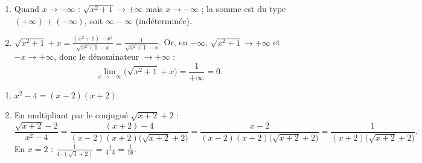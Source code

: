 \documentclass[11pt,a4paper]{article}
\begin{document}
\begin{correction}
\begin{enumerate}[label=\alph*),leftmargin=2em,itemsep=3pt]
  \item Quand $x\to-\infty$ : $\sqrt{x^2+1}\to+\infty$ mais $x\to-\infty$ ; la somme est du type
        $(+\infty)+(-\infty)$, soit $\infty-\infty$ (indéterminée).
  \item $\displaystyle\sqrt{x^2+1}+x=\frac{(x^2+1)-x^2}{\sqrt{x^2+1}-x}=\frac{1}{\sqrt{x^2+1}-x}$.
        Or, en $-\infty$, $\sqrt{x^2+1}\to+\infty$ et $-x\to+\infty$, donc le dénominateur $\to+\infty$ :
        \[ \lim_{x\to-\infty}\bigl(\sqrt{x^2+1}+x\bigr)=\frac{1}{+\infty}=0. \]
\end{enumerate}
\end{correction}

\begin{correction}
\begin{enumerate}[label=\alph*),leftmargin=2em,itemsep=3pt]
  \item $x^2-4=(x-2)(x+2)$.
  \item En multipliant par le conjugué $\sqrt{x+2}+2$ :
  \[ \frac{\sqrt{x+2}-2}{x^2-4}=\frac{(x+2)-4}{(x-2)(x+2)\bigl(\sqrt{x+2}+2\bigr)}
     =\frac{x-2}{(x-2)(x+2)\bigl(\sqrt{x+2}+2\bigr)}=\frac{1}{(x+2)\bigl(\sqrt{x+2}+2\bigr)}. \]
  En $x=2$ : $\displaystyle\frac{1}{4\cdot(\sqrt4+2)}=\frac{1}{4\cdot 4}=\frac{1}{16}$.
\end{enumerate}
\end{correction}
\end{document}
